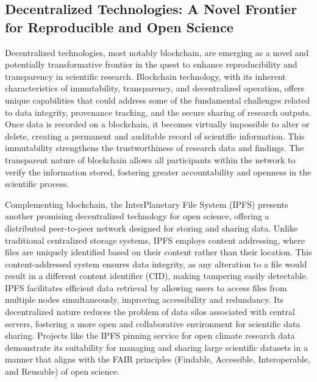 

\subsection{Decentralized Technologies: A Novel Frontier for Reproducible and Open Science}

Decentralized technologies, most notably blockchain, are emerging as a novel and potentially transformative frontier in the quest to enhance reproducibility and transparency in scientific research. Blockchain technology, with its inherent characteristics of immutability, transparency, and decentralized operation, offers unique capabilities that could address some of the fundamental challenges related to data integrity, provenance tracking, and the secure sharing of research outputs. Once data is recorded on a blockchain, it becomes virtually impossible to alter or delete, creating a permanent and auditable record of scientific information. This immutability strengthens the trustworthiness of research data and findings. The transparent nature of blockchain allows all participants within the network to verify the information stored, fostering greater accountability and openness in the scientific process.

Complementing blockchain, the InterPlanetary File System (IPFS) presents another promising decentralized technology for open science, offering a distributed peer-to-peer network designed for storing and sharing data. Unlike traditional centralized storage systems, IPFS employs content addressing, where files are uniquely identified based on their content rather than their location. This content-addressed system ensures data integrity, as any alteration to a file would result in a different content identifier (CID), making tampering easily detectable. IPFS facilitates efficient data retrieval by allowing users to access files from multiple nodes simultaneously, improving accessibility and redundancy. Its decentralized nature reduces the problem of data silos associated with central servers, fostering a more open and collaborative environment for scientific data sharing. Projects like the IPFS pinning service for open climate research data demonstrate its suitability for managing and sharing large scientific datasets in a manner that aligns with the FAIR principles (Findable, Accessible, Interoperable, and Reusable) of open science.

